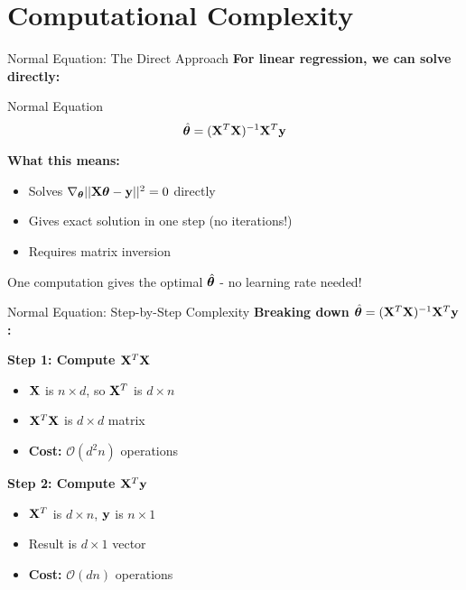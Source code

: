 \documentclass[usenames,dvipsnames]{beamer}
\begin{document}
  \section{Computational Complexity}

  \begin{frame}{Normal Equation: The Direct Approach}
    \textbf{For linear regression, we can solve directly:}
    
    \begin{definitionbox}{Normal Equation}
    $$\hat{\boldsymbol{\theta}} = (\mathbf{X}^T\mathbf{X})^{-1}\mathbf{X}^T\mathbf{y}$$
    \end{definitionbox}
    
    \pause
    \textbf{What this means:}
    \begin{itemize}[<+->]
        \item Solves $\nabla_{\boldsymbol{\theta}} ||\mathbf{X}\boldsymbol{\theta} - \mathbf{y}||^2 = 0$ directly
        \item Gives exact solution in one step (no iterations!)
        \item Requires matrix inversion
    \end{itemize}
    
    \pause
    \begin{keypointsbox}{}
    One computation gives the optimal $\hat{\boldsymbol{\theta}}$ - no learning rate needed!
    \end{keypointsbox}
  \end{frame}

  \begin{frame}{Normal Equation: Step-by-Step Complexity}
    \textbf{Breaking down $\hat{\boldsymbol{\theta}} = (\mathbf{X}^T\mathbf{X})^{-1}\mathbf{X}^T\mathbf{y}$:}
    
    \pause
    \textbf{Step 1: Compute $\mathbf{X}^T\mathbf{X}$}
    \begin{itemize}[<+->]
        \item $\mathbf{X}$ is $n \times d$, so $\mathbf{X}^T$ is $d \times n$
        \item $\mathbf{X}^T\mathbf{X}$ is $d \times d$ matrix
        \item \textbf{Cost:} $\mathcal{O}(d^2 n)$ operations
    \end{itemize}
    
    \pause
    \textbf{Step 2: Compute $\mathbf{X}^T\mathbf{y}$}
    \begin{itemize}[<+->]
        \item $\mathbf{X}^T$ is $d \times n$, $\mathbf{y}$ is $n \times 1$
        \item Result is $d \times 1$ vector
        \item \textbf{Cost:} $\mathcal{O}(dn)$ operations
    \end{itemize}
  \end{frame}
\end{document}

